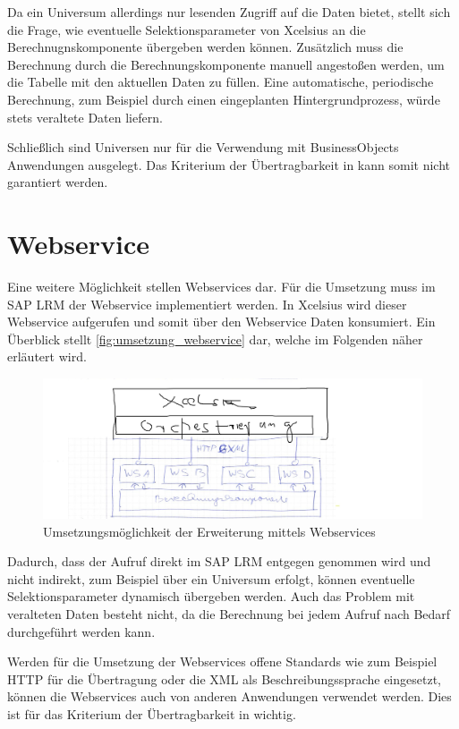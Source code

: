 \begin{onehalfspacing}
Da ein Universum allerdings nur lesenden Zugriff auf die Daten bietet, stellt sich die Frage, wie eventuelle Selektionsparameter von \gls{Xcelsius} an die Berechnugnskomponente übergeben werden können. Zusätzlich muss die Berechnung durch die Berechnungskomponente manuell angestoßen werden, um die Tabelle mit den aktuellen Daten zu füllen. Eine automatische, periodische Berechnung, zum Beispiel durch einen eingeplanten Hintergrundprozess, würde stets veraltete Daten liefern.

Schließlich sind Universen nur für die Verwendung mit BusinessObjects Anwendungen ausgelegt. Das Kriterium der Übertragbarkeit in  kann somit nicht garantiert werden.

\section{Webservice}
Eine weitere Möglichkeit stellen Webservices dar. Für die Umsetzung muss im SAP LRM der Webservice implementiert werden. In \gls{Xcelsius} wird dieser Webservice aufgerufen und somit über den Webservice Daten konsumiert. Ein Überblick stellt \vref{fig:umsetzung_webservice} dar, welche im Folgenden näher erläutert wird.

\begin{figure}[h]
\centering
\setlength{\unitlength}{1mm}
\includegraphics[width=15cm]{images/umsetzung_webservice.jpg}
\caption{Umsetzungsmöglichkeit der Erweiterung mittels Webservices \label{fig:umsetzung_webservice}}
\end{figure} 

Dadurch, dass der Aufruf direkt im SAP LRM entgegen genommen wird und nicht indirekt, zum Beispiel über ein Universum erfolgt, können eventuelle Selektionsparameter dynamisch übergeben werden. Auch das Problem mit veralteten Daten besteht nicht, da die Berechnung bei jedem Aufruf nach Bedarf durchgeführt werden kann.

Werden für die Umsetzung der Webservices offene Standards wie zum Beispiel \gls{HTTP} für die Übertragung oder die \gls{XML} als Beschreibungssprache eingesetzt, können die Webservices auch von anderen Anwendungen verwendet werden. Dies ist für das Kriterium der Übertragbarkeit in  wichtig.


\end{onehalfspacing}
